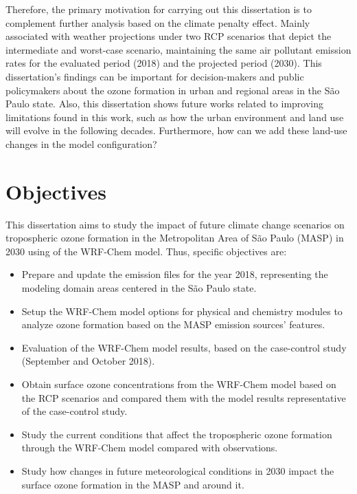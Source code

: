 Therefore, the primary motivation for carrying out this dissertation is to complement further analysis based on the climate penalty effect. 
Mainly associated with weather projections under two RCP scenarios that depict the intermediate and worst-case scenario, maintaining the same air pollutant emission rates for the evaluated period (2018) and the projected period (2030).
This dissertation's findings can be important for decision-makers and public policymakers about the ozone formation in urban and regional areas in the S\~{a}o Paulo state.
Also, this dissertation shows future works related to improving limitations found in this work, such as how the urban environment and land use will evolve in the following decades.
Furthermore, how can we add these land-use changes in the model configuration?


\section{Objectives}\label{sec:obj}
	
	This dissertation aims to study the impact of future climate change scenarios on tropospheric ozone formation in the Metropolitan Area of S\~{a}o Paulo (MASP) in 2030 using of the WRF-Chem model. Thus, specific objectives are:
	
	\begin{itemize}
		\item Prepare and update the emission files for the year 2018, representing the modeling domain areas centered in the S\~{a}o Paulo state.
		\item Setup the WRF-Chem model options for physical and chemistry modules to analyze ozone formation based on the MASP emission sources' features. 
		\item Evaluation of the WRF-Chem model results, based on the case-control study (September and October 2018).
		\item Obtain surface ozone concentrations from the WRF-Chem model based on the RCP scenarios and compared them with the model results representative of the case-control study.
		\item Study the current conditions that affect the tropospheric ozone formation through the WRF-Chem model compared with observations.
		\item Study how changes in future meteorological conditions in 2030 impact the surface ozone formation in the MASP and around it.
	\end{itemize}
	
